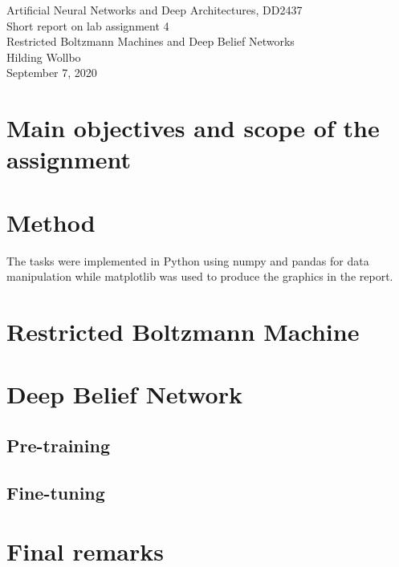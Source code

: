 \documentclass[a4paper]{article}
\begin{document}
\begin{center}
  {\large Artificial Neural Networks and Deep Architectures, DD2437}\\
  \vspace{7mm}
  {\huge Short report on lab assignment 4\\[1ex]}
  {\Large Restricted Boltzmann Machines and Deep Belief Networks}\\
  \vspace{8mm}  
  {\Large Hilding Wollbo\\}
  \vspace{4mm}
  {\large September 7, 2020\\}
\end{center}


\section{Main objectives and scope of the assignment}

\section{Method}
The tasks were implemented in Python using numpy and pandas for data manipulation while matplotlib was used to produce the graphics in the report.
\section{Restricted Boltzmann Machine}

\section{Deep Belief Network}

\subsection{Pre-training}

\subsection{Fine-tuning}

\section{Final remarks}
\end{document}
